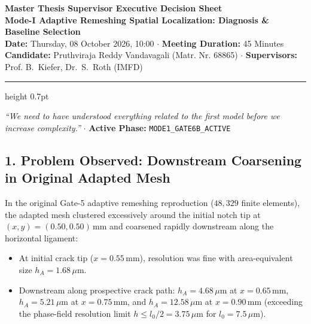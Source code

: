 \documentclass[10pt,a4paper]{article}
\begin{document}
\begin{center}
  {\Large\textbf{Master Thesis Supervisor Executive Decision Sheet}}\\[0.18em]
  {\large\textbf{Mode-I Adaptive Remeshing Spatial Localization: Diagnosis \& Baseline Selection}}\\[0.12em]
  {\normalsize\textbf{Date:} Thursday, 08 October 2026, 10:00 \quad $\cdot$ \quad \textbf{Meeting Duration:} 45 Minutes}\\[0.08em]
  {\footnotesize\textbf{Candidate:} Pruthviraja Reddy Vandavagali (Matr. Nr. 68865) \quad $\cdot$ \quad \textbf{Supervisors:} Prof. B.~Kiefer, Dr.~S.~Roth (IMFD)}
\end{center}
\vspace{-0.45em}
\hrule height 0.7pt
\vspace{0.2em}

\begin{tcolorbox}[colback=blue!5!white,colframe=blue!60!black,title=\textbf{Governing Directive \& Active Phase},top=2pt,bottom=2pt,left=4pt,right=4pt]
\centering
\small\emph{``We need to have understood everything related to the first model before we increase complexity.''} \quad $\cdot$ \quad \textbf{Active Phase:} \texttt{MODE1\_GATE6B\_ACTIVE}
\end{tcolorbox}

\vspace{-0.25em}
\subsection*{1. Problem Observed: Downstream Coarsening in Original Adapted Mesh}
\vspace{-0.25em}
In the original Gate-5 adaptive remeshing reproduction ($48{,}329$ finite elements), the adapted mesh clustered excessively around the initial notch tip at $(x, y) = (0.50, 0.50)\,\mathrm{mm}$ and coarsened rapidly downstream along the horizontal ligament:
\begin{itemize}[itemsep=0.2pt,topsep=0.2pt,leftmargin=4mm]
  \small
  \item At initial crack tip ($x = 0.55\,\mathrm{mm}$), resolution was fine with area-equivalent size $h_A = 1.68\,\mu\mathrm{m}$.
  \item Downstream along prospective crack path: $h_A = 4.68\,\mu\mathrm{m}$ at $x = 0.65\,\mathrm{mm}$, $h_A = 5.21\,\mu\mathrm{m}$ at $x = 0.75\,\mathrm{mm}$, and $h_A = 12.58\,\mu\mathrm{m}$ at $x = 0.90\,\mathrm{mm}$ (exceeding the phase-field resolution limit $h \le l_0/2 = 3.75\,\mu\mathrm{m}$ for $l_0 = 7.5\,\mu\mathrm{m}$).
\end{itemize}
\end{document}
